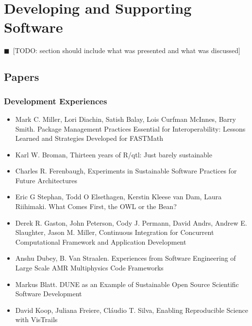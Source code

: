 \documentclass[11pt, oneside]{amsart}
\newcommand{\todo}[1]{{\color{blue}$\blacksquare$~\textsf{[TODO: #1]}}}
\begin{document}
\section{Developing and Supporting Software}

\todo{section should include what was presented and what was discussed}

\subsection{Papers}

\subsubsection*{Development Experiences}

\begin{itemize}

\item Mark C. Miller, Lori Diachin, Satish Balay, Lois Curfman McInnes, Barry Smith. Package Management Practices Essential for Interoperability: Lessons Learned and Strategies Developed for FASTMath \cite{Miller_WSSSPE}

\item Karl W. Broman, Thirteen years of R/qtl: Just barely sustainable \cite{Broman_WSSSPE}

\item Charles R. Ferenbaugh, Experiments in Sustainable Software Practices for Future Architectures \cite{Ferenbaugh_WSSSPE}

\item Eric G Stephan, Todd O Elsethagen, Kerstin Kleese van Dam, Laura Riihimaki. What Comes First, the OWL or the Bean? \cite{Stephan_WSSSPE}

\item Derek R. Gaston, John Peterson, Cody J. Permann, David Andrs, Andrew E. Slaughter, Jason M. Miller, Continuous Integration for Concurrent Computational Framework and Application Development \cite{Gaston_WSSSPE}

\item Anshu Dubey, B. Van Straalen. Experiences from Software Engineering of Large Scale AMR Multiphysics Code Frameworks \cite{Dubey_WSSSPE}

\item Markus Blatt. DUNE as an Example of Sustainable Open Source Scientific Software Development \cite{Blatt_WSSSPE}

\item David Koop, Juliana Freiere, Cl\'{a}udio T. Silva, Enabling Reproducible Science with VisTrails~\cite{Koop_WSSSPE}


\end{itemize}
\end{document}
